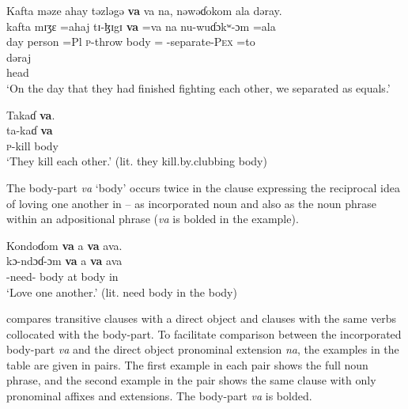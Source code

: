\ea \label{ex:9:59}
Kafta  məze  ahay  təzləgə  \textbf{va}  va  na,  nəwəɗokom  ala  dəray.\\
\gll  kafta  mɪʒɛ  =ahaj  tɪ-ɮɪgɪ    \textbf{va}  =va  na  nu-wuɗɔkʷ{}-ɔm     =ala\\  
      day       person  =Pl  \textsc{p}-throw      body  ={\PRF}  {\PSP}  {\oneS}-separate-\textsc{Pex} =to \\ 
      
      \medskip
\gll dəraj\\
     head\\
\glt  ‘On the day that they had finished fighting each other, we separated as equals.’
\z

\ea \label{ex:9:60}
Takaɗ  \textbf{va}.\\
\gll  ta-kaɗ   \textbf{va}\\
      \textsc{p}-kill  body\\
\glt  ‘They kill each other.’ (lit. they kill.by.clubbing body)
\z

The body-part \textit{va} ‘body’ occurs twice in the clause expressing the reciprocal idea of loving one another in  -- as incorporated noun and also as the noun phrase within an adpositional phrase (\textit{va} is bolded in the example).

\ea \label{ex:9:61}
Kondoɗom  \textbf{va}  a  \textbf{va}  ava.\\
\gll  kɔ-ndɔɗ-ɔm    \textbf{va}  a  \textbf{va}  ava\\
      {\twoP}-need-{\twoP}    body  at  body  in\\
\glt  ‘Love one another.’ (lit. need body in the body)
\z

 compares transitive clauses with a direct object and clauses with the same verbs collocated with the body-part. To facilitate comparison between the incorporated body-part \textit{va}  and the direct object pronominal extension \textit{na}, the examples in the table are given in pairs. The first example in each pair shows the full noun phrase, and the second example in the pair shows the same clause with only pronominal affixes and extensions. The body-part \textit{va} is bolded.

